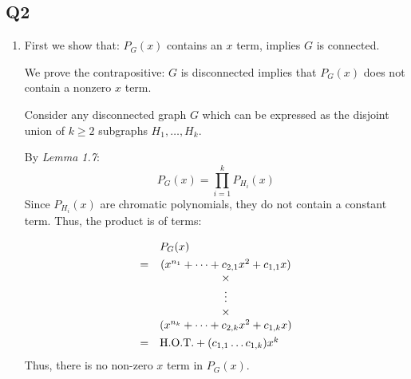 \documentclass[a4paper, 11pt]{article}
\begin{document}
\begin{multicols*}{2}
	\section*{Q2}

	\begin{enumerate}[label=(\alph*)]
		\item

		      First we show that: $P_G(x)$ contains an $x$ term, implies $G$ is connected.

		      \begin{mdframed}
			      We prove the contrapositive: $G$ is disconnected implies that $P_G(x)$ does not contain a nonzero $x$ term.

			      Consider any disconnected graph $G$ which can be expressed as the disjoint union of $k\geq2$ subgraphs $H_1,\dots,H_k$.

			      By \textit{Lemma 1.7}:
			      $$P_G(x)= \prod_{i=1}^k P_{H_i}(x)$$
			      Since $P_{H_i}(x)$ are chromatic polynomials, they do not contain a constant term. Thus, the product is of terms:

			      \begin{align*}
				       & \begin{matrix}
					          & \hphantom{=} P_G(x) \\
				         \end{matrix}                         \\
				       & \begin{matrix}
					         = & (x^{n_1} + \dots + c_{2,1}x^2 + c_{1,1}x ) \\
					           & \times                                     \\
					           & \vdots                                     \\
					           & \times                                     \\
					           & (x^{n_k} + \dots + c_{2,k}x^2 + c_{1,k}x )
				         \end{matrix} \\
				       & \begin{matrix}
					         = & \text{H.O.T.} + (c_{1,1}\dots c_{1,k})x^k \\
				         \end{matrix}  \\
			      \end{align*}
			      Thus, there is no non-zero $x$ term in $P_G(x)$.
		      \end{mdframed}



\end{enumerate}
\end{multicols*}
\end{document}
